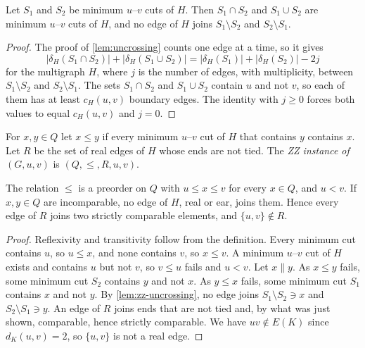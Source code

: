 \begin{lemma}[Uncrossing in $H$]
\label{lem:zz-uncrossing}
Let $S_1$ and $S_2$ be minimum $u$--$v$ cuts of $H$.
Then $S_1 \cap S_2$ and $S_1 \cup S_2$ are minimum $u$--$v$ cuts of $H$, and no edge of $H$ joins $S_1 \setminus S_2$ and $S_2 \setminus S_1$.
\end{lemma}

\begin{proof}
The proof of \cref{lem:uncrossing} counts one edge at a time, so it gives
\[
|\delta_H(S_1 \cap S_2)| + |\delta_H(S_1 \cup S_2)| = |\delta_H(S_1)| + |\delta_H(S_2)| - 2 j
\]
for the multigraph $H$, where $j$ is the number of edges, with multiplicity, between $S_1 \setminus S_2$ and $S_2 \setminus S_1$.
The sets $S_1 \cap S_2$ and $S_1 \cup S_2$ contain $u$ and not $v$, so each of them has at least $c_H(u, v)$ boundary edges.
The identity with $j \geq 0$ forces both values to equal $c_H(u, v)$ and $j = 0$.
\end{proof}

\begin{definition}
\label{def:zz-instance}
For $x, y \in Q$ let $x \leq y$ if every minimum $u$--$v$ cut of $H$ that contains $y$ contains $x$.
Let $R$ be the set of real edges of $H$ whose ends are not tied.
The \emph{ZZ instance of} $(G, u, v)$ is $(Q, \leq, R, u, v)$.
\end{definition}

\begin{lemma}
\label{lem:zz-incomparable}
The relation $\leq$ is a preorder on $Q$ with $u \leq x \leq v$ for every $x \in Q$, and $u < v$.
If $x, y \in Q$ are incomparable, no edge of $H$, real or ear, joins them.
Hence every edge of $R$ joins two strictly comparable elements, and $\{u, v\} \notin R$.
\end{lemma}

\begin{proof}
Reflexivity and transitivity follow from the definition.
Every minimum cut contains $u$, so $u \leq x$, and none contains $v$, so $x \leq v$.
A minimum $u$--$v$ cut of $H$ exists and contains $u$ but not $v$, so $v \leq u$ fails and $u < v$.
Let $x \parallel y$.
As $x \leq y$ fails, some minimum cut $S_2$ contains $y$ and not $x$.
As $y \leq x$ fails, some minimum cut $S_1$ contains $x$ and not $y$.
By \cref{lem:zz-uncrossing}, no edge joins $S_1 \setminus S_2 \ni x$ and $S_2 \setminus S_1 \ni y$.
An edge of $R$ joins ends that are not tied and, by what was just shown, comparable, hence strictly comparable.
We have $uv \notin E(K)$ since $d_K(u, v) = 2$, so $\{u, v\}$ is not a real edge.
\end{proof}


